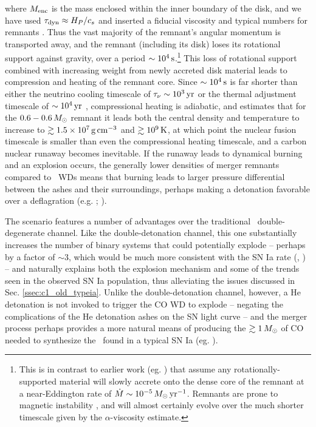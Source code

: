 \noindent where $M_\mathrm{enc}$ is the mass enclosed within the inner boundary of the disk, and we have used $\taudyn \approx H_P/c_s$ and inserted a fiducial viscosity and typical numbers for remnants \citep{shen+12}.  Thus the vast majority of the remnant's angular momentum is transported away, and the remnant (including its disk) loses its rotational support against gravity, over a period $\sim10^4\,\mathrm{s}$.\footnote{This is in contrast to earlier work (eg. \citealt{nomoi85, yoonpr07}) that assume any rotationally-supported material will slowly accrete onto the dense core of the remnant at a near-Eddington rate of $\dot{M} \sim 10^{-5}\,\Msun\,\pyr$.  Remnants are prone to magnetic instability \citep{shen+12,ji+13}, and will almost certainly evolve over the much shorter timescale given by the $\alpha$-viscosity estimate.}  This loss of rotational support combined with increasing weight from newly accreted disk material leads to compression and heating of the remnant core.  Since $\sim10^4\,\mathrm{s}$ is far shorter than either the neutrino cooling timescale of $\taunu \sim 10^3\,\mrm{yr}$ or the thermal adjustment timescale of $\sim10^4\,\mathrm{yr}$ \citep{shen+12}, compressional heating is adiabatic, and \citeal{vkercj10} estimates that for the $0.6-0.6\,\Msun$ remnant it leads both the central density and temperature to increase to $\gtrsim1.5\times10^7\,\gcc$ and $\gtrsim10^9\,\mathrm{K}$, at which point the nuclear fusion timescale is smaller than even the compressional heating timescale, and a carbon nuclear runaway becomes inevitable.  If the runaway leads to dynamical burning and an explosion occurs, the generally lower densities of merger remnants compared to \Mch\ WDs means that burning leads to larger pressure differential between the ashes and their surroundings, perhaps making a detonation favorable over a deflagration (e.g. \citealt{mazumw77}; \citealt{seit+09}).

The \citeal{vkercj10} scenario features a number of advantages over the traditional \Mch\ double-degenerate channel.  Like the double-detonation channel, this one substantially increases the number of binary systems that could potentially explode -- perhaps by a factor of $\sim3$, which would be much more consistent with the SN Ia rate (\citeal{vkercj10}, \citealt{badem12}) -- and naturally explains both the explosion mechanism and some of the trends seen in the observed SN Ia population, thus alleviating the issues discussed in Sec. \ref{ssec:c1_old_typeia}.  Unlike the double-detonation channel, however, a He detonation is not invoked to trigger the CO WD to explode -- negating the complications of the He detonation ashes on the SN light curve -- and the merger process perhaps provides a more natural means of producing the $\gtrsim1\,\Msun$ of CO needed to synthesize the \Ni\ found in a typical SN Ia (eg. \citealt{pirotk14}).


